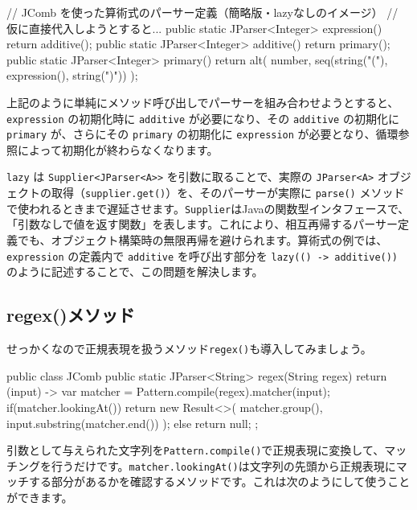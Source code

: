 \begin{codescreen}{}
// JComb を使った算術式のパーサー定義（簡略版・lazyなしのイメージ）
// 仮に直接代入しようとすると...
public static JParser<Integer> expression() {
    return additive(); 
}
public static JParser<Integer> additive() {
    return primary();   
}
public static JParser<Integer> primary() {
    return alt(
        number,
        seq(string("("), expression(), string(")"))
    );
}
\end{codescreen}

上記のように単純にメソッド呼び出しでパーサーを組み合わせようとすると、\texttt{expression}
の初期化時に \texttt{additive} が必要になり、その \texttt{additive}
の初期化に \texttt{primary} が、さらにその \texttt{primary} の初期化に
\texttt{expression}
が必要となり、循環参照によって初期化が終わらなくなります。

\texttt{lazy} は
\texttt{Supplier\textless{}JParser\textless{}A\textgreater{}\textgreater{}}
を引数に取ることで、実際の \texttt{JParser\textless{}A\textgreater{}}
オブジェクトの取得（\texttt{supplier.get()}）を、そのパーサーが実際に
\texttt{parse()}
メソッドで使われるときまで遅延させます。\texttt{Supplier}はJavaの関数型インタフェースで、「引数なしで値を返す関数」を表します。これにより、相互再帰するパーサー定義でも、オブジェクト構築時の無限再帰を避けられます。算術式の例では、\texttt{expression}
の定義内で \texttt{additive} を呼び出す部分を
\texttt{lazy(()\ -\textgreater{}\ additive())}
のように記述することで、この問題を解決します。

\subsection{regex()メソッド}

せっかくなので正規表現を扱うメソッド\texttt{regex()}も導入してみましょう。

\begin{codescreen}{}
public class JComb {
    public static JParser<String> regex(String regex) {
        return (input) -> {
            var matcher = Pattern.compile(regex).matcher(input);
            if(matcher.lookingAt()) {
                return new Result<>(
                    matcher.group(), input.substring(matcher.end())
                );
            } else {
                return null;
            }
        };
    }
}
\end{codescreen}

引数として与えられた文字列を\texttt{Pattern.compile()}で正規表現に変換して、マッチングを行うだけです。\texttt{matcher.lookingAt()}は文字列の先頭から正規表現にマッチする部分があるかを確認するメソッドです。これは次のようにして使うことができます。

